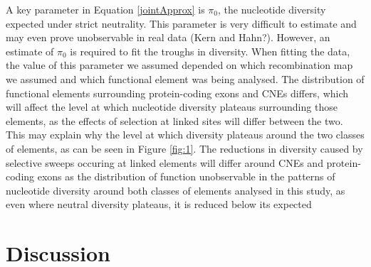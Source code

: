 \documentclass[11pt]{article}
\begin{document}
	A key parameter in Equation \ref{jointApprox} is $\pi_0$, the nucleotide diversity expected under strict neutrality. This parameter is very difficult to estimate and may even prove unobservable in real data (Kern and Hahn?). However, an estimate of $\pi_0$ is required to fit the troughs in diversity. When fitting the data, the value of this parameter we assumed depended on which recombination map we assumed and which functional element was being analysed. The distribution of functional elements surrounding protein-coding exons and CNEs differs, which will affect the level at which nucleotide diversity plateaus surrounding those elements, as the effects of selection at linked sites will differ between the two. This may explain why the level at which diversity plateaus around the two classes of elements, as can be seen in Figure \ref{fig:1}.
	The reductions in diversity caused by selective sweeps occuring at linked elements will differ around CNEs and protein-coding exons as the distribution of function
	unobservable in the patterns of nucleotide diversity around both classes of elements analysed in this study, as even where neutral diversity plateaus, it is reduced below its expected 





%
%

\section*{Discussion}
\end{document}
